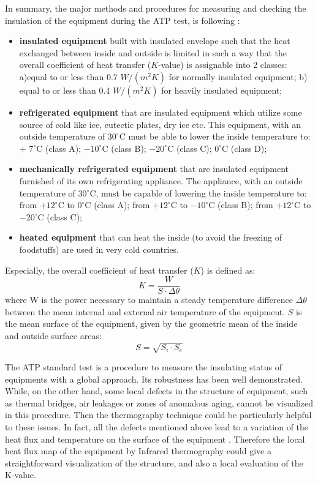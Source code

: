 In summary, the major methods and procedures for measuring and checking the insulation of the equipment during the ATP test, is following \citep{rossi2009k}: 
\begin{itemize}
	\item \textbf{insulated equipment} built with insulated envelope such that the heat exchanged between inside and outside is limited in such a way that the overall coefficient of heat transfer ($K$-value) is assignable into 2 classes: a)equal to or less than 0.7 $W/(m^2 K)$ for normally insulated equipment; b) equal to or less than 0.4 $W/(m^2 K)$ for heavily insulated equipment; 
	
	\item\textbf{refrigerated equipment} that are insulated equipment which utilize some source of cold like ice, eutectic plates, dry ice etc. This equipment, with an outside temperature of $30^{\circ}$C must be able to lower the inside temperature to: + $7^{\circ}$C (class A); $-10^{\circ}$C (class B); $-20^{\circ}$C (class C); $0^{\circ}$C (class D); 
	
	\item \textbf{mechanically refrigerated equipment} that  are  insulated  equipment  furnished  of  its  own  refrigerating appliance.  The  appliance,  with  an  outside  temperature  of  $30^{\circ}$C,  must  be  capable  of  lowering  the  inside temperature to: from $+12^{\circ}$C to $0^{\circ}$C (class A); from $+ 12^{\circ}$C to $-10^{\circ}$C (class B); from $+ 12^{\circ}$C to $- 20^{\circ}$C (class C); 
	
	\item \textbf{heated  equipment} that  can  heat  the  inside  (to  avoid  the  freezing  of  foodstuffs)  are  used  in  very  cold countries.
\end{itemize}
Especially, the overall coefficient of heat transfer ($K$) is defined as:
\begin{equation}
K = \frac{W}{S\cdot \Delta \theta}
\end{equation}
where W is  the  power  necessary  to  maintain  a  steady  temperature  difference $\Delta \theta$ between  the  mean internal and external air temperature of the equipment. $S$ is the mean surface of the equipment, given by the geometric mean of the inside and outside surface areas:
\begin{equation}
S = \sqrt{S_i \cdot S_e}
\end{equation}

The ATP standard test is a procedure to measure the insulating status of equipments with a global approach. Its robustness has been well demonstrated. While, on the other hand, some local defects in the structure of equipment, such as thermal bridges, air leakages or zones of anomalous aging, cannot be visualized in this procedure. Then the thermography technique could be particularly helpful to these issues. In fact, all the defects mentioned above lead to a variation of the heat flux and temperature on the surface of the equipment \citep{grinzatoquality,grinzato1comparison}. Therefore the local heat flux map of the equipment by Infrared thermography could give a straightforward visualization of the structure, and also a local evaluation of the K-value.

